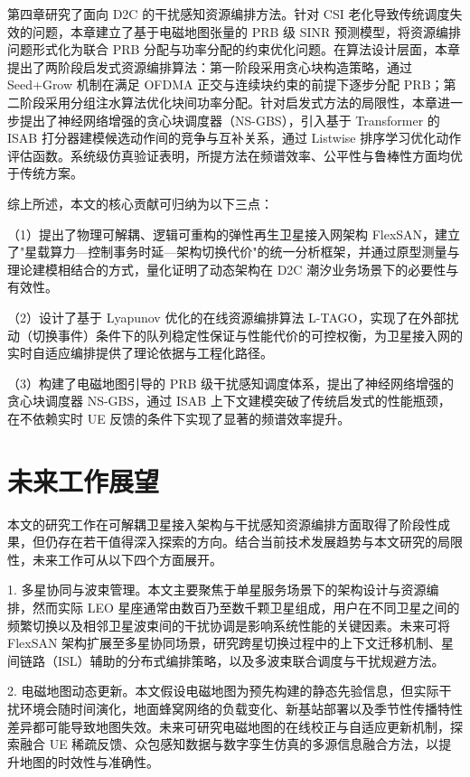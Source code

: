 \documentclass[type=master]{fduthesis}
\begin{document}
第四章研究了面向 D2C 的干扰感知资源编排方法。针对 CSI 老化导致传统调度失效的问题，本章建立了基于电磁地图张量的 PRB 级 SINR 预测模型，将资源编排问题形式化为联合 PRB 分配与功率分配的约束优化问题。在算法设计层面，本章提出了两阶段启发式资源编排算法：第一阶段采用贪心块构造策略，通过 Seed+Grow 机制在满足 OFDMA 正交与连续块约束的前提下逐步分配 PRB；第二阶段采用分组注水算法优化块间功率分配。针对启发式方法的局限性，本章进一步提出了神经网络增强的贪心块调度器（NS-GBS），引入基于 Transformer 的 ISAB 打分器建模候选动作间的竞争与互补关系，通过 Listwise 排序学习优化动作评估函数。系统级仿真验证表明，所提方法在频谱效率、公平性与鲁棒性方面均优于传统方案。

综上所述，本文的核心贡献可归纳为以下三点：

（1）提出了物理可解耦、逻辑可重构的弹性再生卫星接入网架构 FlexSAN，建立了"星载算力—控制事务时延—架构切换代价"的统一分析框架，并通过原型测量与理论建模相结合的方式，量化证明了动态架构在 D2C 潮汐业务场景下的必要性与有效性。

（2）设计了基于 Lyapunov 优化的在线资源编排算法 L-TAGO，实现了在外部扰动（切换事件）条件下的队列稳定性保证与性能代价的可控权衡，为卫星接入网的实时自适应编排提供了理论依据与工程化路径。

（3）构建了电磁地图引导的 PRB 级干扰感知调度体系，提出了神经网络增强的贪心块调度器 NS-GBS，通过 ISAB 上下文建模突破了传统启发式的性能瓶颈，在不依赖实时 UE 反馈的条件下实现了显著的频谱效率提升。

\section{未来工作展望}

本文的研究工作在可解耦卫星接入架构与干扰感知资源编排方面取得了阶段性成果，但仍存在若干值得深入探索的方向。结合当前技术发展趋势与本文研究的局限性，未来工作可从以下四个方面展开。

1. 多星协同与波束管理。本文主要聚焦于单星服务场景下的架构设计与资源编排，然而实际 LEO 星座通常由数百乃至数千颗卫星组成，用户在不同卫星之间的频繁切换以及相邻卫星波束间的干扰协调是影响系统性能的关键因素。未来可将 FlexSAN 架构扩展至多星协同场景，研究跨星切换过程中的上下文迁移机制、星间链路（ISL）辅助的分布式编排策略，以及多波束联合调度与干扰规避方法。

2. 电磁地图动态更新。本文假设电磁地图为预先构建的静态先验信息，但实际干扰环境会随时间演化，地面蜂窝网络的负载变化、新基站部署以及季节性传播特性差异都可能导致地图失效。未来可研究电磁地图的在线校正与自适应更新机制，探索融合 UE 稀疏反馈、众包感知数据与数字孪生仿真的多源信息融合方法，以提升地图的时效性与准确性。
\end{document}
